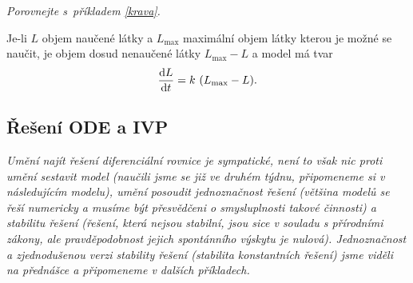 \textit{Porovnejte s příkladem \ref{krava}.}

\reseni
Je-li $L$ objem naučené látky a $L_{\max}$ maximální objem látky kterou je možné se naučit, je objem dosud nenaučené látky $L_{\max}-L$ a model má tvar
$$\derivace Lt=k (L_{\max}-L).$$
\konec

\stranka

\subsection{Řešení ODE a IVP} 


\textit{Umění najít řešení diferenciální rovnice je sympatické, není to však nic proti umění sestavit model (naučili jsme se již ve druhém týdnu, připomeneme si v následujícím modelu), umění posoudit jednoznačnost řešení (většina modelů se řeší numericky a musíme být přesvědčeni o smysluplnosti takové činnosti) a  stabilitu řešení (řešení, která nejsou stabilní, jsou sice v souladu s přírodními zákony, ale pravděpodobnost jejich spontánního výskytu je nulová). Jednoznačnost a zjednodušenou verzi stability řešení (stabilita konstantních řešení) jsme viděli na přednášce a připomeneme v dalších příkladech.}

\stranka

\def\priklad #1.{$#1$}

\reseni

